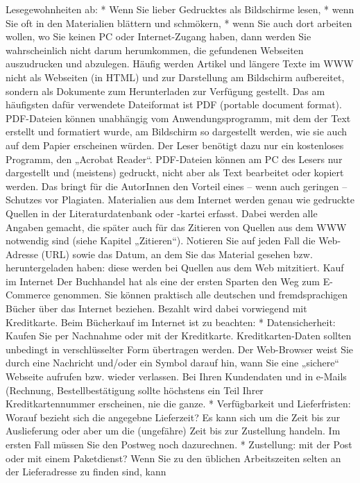\documentclass[]{book}
\theoremstyle{definition}
\theoremstyle{definition}
\theoremstyle{definition}
\theoremstyle{remark}
\begin{document}
Lesegewohnheiten ab: * Wenn Sie lieber Gedrucktes als Bildschirme lesen,
* wenn Sie oft in den Materialien blättern und schmökern, * wenn Sie
auch dort arbeiten wollen, wo Sie keinen PC oder Internet-Zugang haben,
dann werden Sie wahrscheinlich nicht darum herumkommen, die gefundenen
Webseiten auszudrucken und abzulegen. Häufig werden Artikel und längere
Texte im WWW nicht als Webseiten (in HTML) und zur Darstellung am
Bildschirm aufbereitet, sondern als Dokumente zum Herunterladen zur
Verfügung gestellt. Das am häufigsten dafür verwendete Dateiformat ist
PDF (portable document format). PDF-Dateien können unabhängig vom
Anwendungsprogramm, mit dem der Text erstellt und formatiert wurde, am
Bildschirm so dargestellt werden, wie sie auch auf dem Papier erscheinen
würden. Der Leser benötigt dazu nur ein kostenloses Programm, den
„Acrobat Reader``. PDF-Dateien können am PC des Lesers nur dargestellt
und (meistens) gedruckt, nicht aber als Text bearbeitet oder kopiert
werden. Das bringt für die AutorInnen den Vorteil eines -- wenn auch
geringen -- Schutzes vor Plagiaten. Materialien aus dem Internet werden
genau wie gedruckte Quellen in der Literaturdatenbank oder -kartei
erfasst. Dabei werden alle Angaben gemacht, die später auch für das
Zitieren von Quellen aus dem WWW notwendig sind (siehe Kapitel
„Zitieren``). Notieren Sie auf jeden Fall die Web-Adresse (URL) sowie
das Datum, an dem Sie das Material gesehen bzw. heruntergeladen haben:
diese werden bei Quellen aus dem Web mitzitiert. Kauf im Internet Der
Buchhandel hat als eine der ersten Sparten den Weg zum E-Commerce
genommen. Sie können praktisch alle deutschen und fremdsprachigen Bücher
über das Internet beziehen. Bezahlt wird dabei vorwiegend mit
Kreditkarte. Beim Bücherkauf im Internet ist zu beachten: *
Datensicherheit: Kaufen Sie per Nachnahme oder mit der Kreditkarte.
Kreditkarten-Daten sollten unbedingt in verschlüsselter Form übertragen
werden. Der Web-Browser weist Sie durch eine Nachricht und/oder ein
Symbol darauf hin, wann Sie eine „sichere`` Webseite aufrufen bzw.
wieder verlassen. Bei Ihren Kundendaten und in e-Mails (Rechnung,
Bestellbestätigung sollte höchstens ein Teil Ihrer Kreditkartennummer
erscheinen, nie die ganze. * Verfügbarkeit und Lieferfristen: Worauf
bezieht sich die angegebne Lieferzeit? Es kann sich um die Zeit bis zur
Auslieferung oder aber um die (ungefähre) Zeit bis zur Zustellung
handeln. Im ersten Fall müssen Sie den Postweg noch dazurechnen. *
Zustellung: mit der Post oder mit einem Paketdienst? Wenn Sie zu den
üblichen Arbeitszeiten selten an der Lieferadresse zu finden sind, kann
\end{document}
